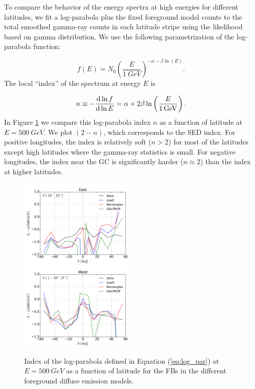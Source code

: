 To compare the behavior of the energy spectra at high energies for different latitudes, 
we fit a log-parabola plus the fixed foreground model counts to the 
total smoothed gamma-ray counts in each latitude stripe using the likelihood based on gamma distribution.
We use the following parametrization of the log-parabola function:

 \begin{equation}
 f(E) = N_0 \left(\frac{E}{\SI{1}{GeV}}\right)^{-\alpha - \beta \ln(E)}.
 \end{equation}
The local ``index'' of the spectrum at energy $E$ is

\begin{equation}
\lb{eq:log_par}
n \equiv - \frac{\de \ln f}{\de \ln E} = \alpha + 2 \beta \ln\left(\frac{E}{\SI{1}{GeV}}\right).
\end{equation}
In Figure \ref{fig:logpar_index} we compare this log-parabola index $n$ as a function of latitude at $E = \SI{500}{GeV}$. 
We plot $(2 - n)$, which corresponds to the SED index.
For positive longitudes, the index is relatively soft ($n > 2$) for most of the latitudes
except high latitudes where the gamma-ray statistics is small.
For negative longitudes, the index near the GC
is significantly harder ($n \approx 2$) than the index at higher latitudes.
\begin{figure}[h!]
\includegraphics[width=0.5\textwidth]{plots/LogParabola_n(500GeV)_l_in_(0,10).pdf}
\includegraphics[width=0.5\textwidth]{plots/LogParabola_n(500GeV)_l_in_(-10,0).pdf}
\caption{
Index of the log-parabola defined in Equation (\ref{eq:log_par}) at  $E = \SI{500}{GeV}$ as a function of latitude for the FBs in 
the different foreground diffuse emission models.
}
\label{fig:logpar_index}
\end{figure}


